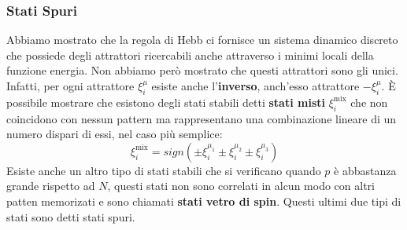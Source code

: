 \documentclass[12pt, a4paper]{book}
\theoremstyle{theorem}
\begin{document}
				\subsubsection{Stati Spuri}
					Abbiamo mostrato che la regola di Hebb ci fornisce un sistema dinamico discreto che possiede degli attrattori ricercabili anche attraverso i minimi locali della funzione energia.
					Non abbiamo però mostrato che questi attrattori sono gli unici. Infatti, per ogni attrattore $\xi_i^\mu$ esiste anche l'{\bf inverso}, anch'esso attrattore $-\xi_i^\mu$.
					È possibile mostrare che esistono degli stati stabili detti {\bf stati misti} $\xi_i^{\text{mix}}$ che non coincidono con nessun pattern ma rappresentano una combinazione lineare di un numero dispari di essi, nel caso più semplice:
					\begin{equation}
						\xi_i^{\text{mix}} = sign(\pm \xi_i^{\mu_1} \pm \xi_i^{\mu_2} \pm \xi_i^{\mu_3})
					\end{equation}
					Esiste anche un altro tipo di stati stabili che si verificano quando $p$ è abbastanza grande rispetto ad $N$, questi stati non sono correlati in alcun modo con altri patten memorizati e sono chiamati {\bf stati vetro di spin}.
					Questi ultimi due tipi di stati sono detti stati spuri.
\end{document}
